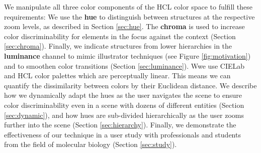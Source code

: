 \documentclass{egpubl}
\begin{document}
	We manipulate all three color components of the HCL color space to fulfill these requirements: 
	We use the \textbf{hue} to distinguish between structures at the respective zoom levels, as described in Section \ref{sec:hue}. 
	The \textbf{chroma} is used to increase color discriminability for elements in the focus against the context (Section \ref{sec:chroma}). 
	Finally, we indicate structures from lower hierarchies in the \textbf{luminance} channel to mimic illustrator techniques (see Figure \ref{fig:motivation}) and to smoothen color transitions (Section \ref{sec:luminance}). 
	Wwe use CIELab and HCL color palettes which are perceptually linear. 
	This means we can quantify the dissimilarity between colors by their Euclidean distance.
	We describe how we dynamically adapt the hues as the user navigates the scene to ensure color discriminability even in a scene with dozens of different entities (Section \ref{sec:dynamic}), and how hues are sub-divided hierarchically as the user zooms further into the scene (Section \ref{sec:hierarchy}). 
	Finally, we demonstrate the effectiveness of our technique in a user study with professionals and students from the field of molecular biology (Section \ref{sec:study}). 
	
	
	
\end{document}
